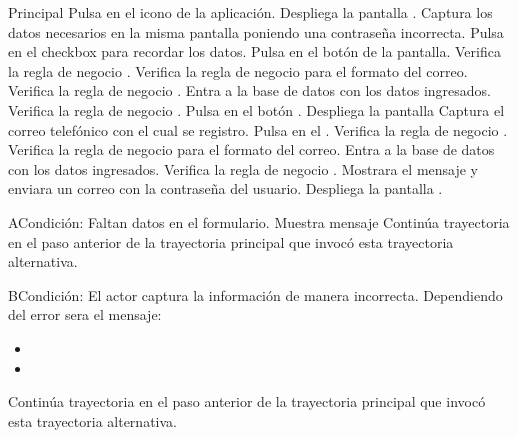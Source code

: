 	\begin{UCtrayectoria}{Principal}
		\UCpaso[\UCactor] Pulsa en el icono de la aplicación.
		\UCpaso[\UCsist] Despliega la pantalla .
		\UCpaso[\UCactor] Captura los datos necesarios en la misma pantalla poniendo una contraseña incorrecta.
		\UCpaso[\UCactor] Pulsa en el checkbox para recordar los datos.
		\UCpaso[\UCactor] Pulsa en el botón  de la pantalla.
		\UCpaso[\UCsist] Verifica la regla de negocio . 
		\UCpaso[\UCsist] Verifica la regla de negocio   para el formato del correo. 
		\UCpaso[\UCsist] Verifica la regla de negocio . 
		\UCpaso[\UCsist] Entra a la base de datos con los datos ingresados. 		
		\UCpaso[\UCsist] Verifica la regla de negocio . 
		\UCpaso[\UCactor] Pulsa en el botón .
		\UCpaso[\UCsist] Despliega la pantalla 
		\UCpaso[\UCactor] Captura el correo telefónico con el cual se registro.
		\UCpaso[\UCactor] Pulsa en el  .
		\UCpaso[\UCsist] Verifica la regla de negocio . 
		\UCpaso[\UCsist] Verifica la regla de negocio  para el formato del correo. 
		\UCpaso[\UCsist] Entra a la base de datos con los datos ingresados. 		
		\UCpaso[\UCsist] Verifica la regla de negocio . 
		\UCpaso[\UCsist] Mostrara el mensaje  y enviara un correo con la contraseña del usuario.
		\UCpaso[\UCsist] Despliega la pantalla .
	\end{UCtrayectoria}
	\begin{UCtrayectoriaA}{A}{Condición: Faltan datos en el formulario.}
		\UCpaso[\UCsist] Muestra mensaje 
		\UCpaso[\UCsist] Continúa trayectoria en el paso anterior de la trayectoria  principal que invocó esta trayectoria alternativa. 
	\end{UCtrayectoriaA}
	\begin{UCtrayectoriaA}{B}{Condición: El actor captura la información de manera incorrecta.}
		\UCpaso[\UCsist] Dependiendo del error sera el mensaje:
			\begin{itemize}
			\item {}
			\item {}
			\end{itemize}
		\UCpaso[\UCsist] Continúa trayectoria en el paso anterior de la trayectoria principal que invocó esta trayectoria alternativa. 
	\end{UCtrayectoriaA}
